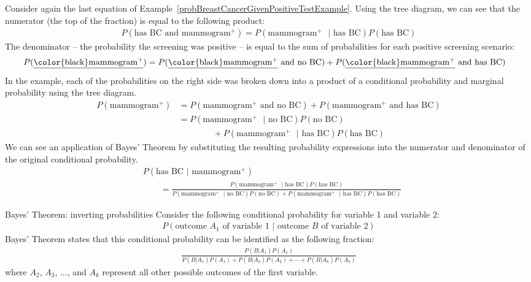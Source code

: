 Consider again the last equation of Example~\ref{probBreastCancerGivenPositiveTestExample}.
Using the tree diagram, we can see that the numerator (the top of the fraction) is equal to the following product:
\begin{align*}
P(\text{has BC and mammogram$^+$}) = P(\text{mammogram$^+$ } | \text{ has BC})P(\text{has BC})
\end{align*}
The denominator -- the probability the screening was positive -- is equal to the sum of probabilities for each positive screening scenario:
\begin{align*}
P(\text{\underline{\color{black}mammogram$^+$}})
	&= P(\text{\underline{\color{black}mammogram$^+$} and no BC})
		+ P(\text{\underline{\color{black}mammogram$^+$} and has BC})
\end{align*}
In the example, each of the probabilities on the right side was broken down into a product of a conditional probability and marginal probability using the tree diagram.
\begin{align*}
P(\text{mammogram$^+$})
	&= P(\text{mammogram$^+$ and no BC}) + P(\text{mammogram$^+$ and has BC}) \\
	&= P(\text{mammogram$^+$ } | \text{ no BC})P(\text{no BC}) \\
			   &\qquad\qquad + P(\text{mammogram$^+$ } | \text{ has BC})P(\text{has BC})
\end{align*}
We can see an application of Bayes' Theorem by substituting the resulting probability expressions into the numerator and denominator of the original conditional probability.
\begin{align*}
& P(\text{has BC } | \text{ mammogram$^+$})  \\
& \qquad= \frac{P(\text{mammogram$^+$ } | \text{ has BC})P(\text{has BC})}
	{P(\text{mammogram$^+$ } | \text{ no BC})P(\text{no BC}) + P(\text{mammogram$^+$ } | \text{ has BC})P(\text{has BC})}
\end{align*}

\begin{onebox}{Bayes' Theorem: inverting probabilities}
Consider the following conditional probability for variable 1 and variable 2:\vspace{-1.5mm}
\begin{align*}
P(\text{outcome $A_1$ of variable 1 } | \text{ outcome $B$ of variable 2})
\end{align*}
Bayes' Theorem states that this conditional probability can be identified as the following fraction:\vspace{-1.5mm}
\begin{align*}
\frac{P(B | A_1) P(A_1)}
	{P(B | A_1) P(A_1) + P(B | A_2) P(A_2) + \cdots + P(B | A_k) P(A_k)}
\end{align*}
where $A_2$, $A_3$, ..., and $A_k$ represent all other possible outcomes of the first variable.
\end{onebox}

